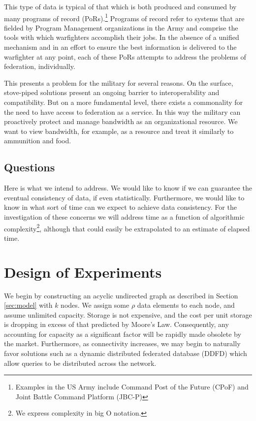 \documentclass[10pt]{./IEEEtran}
\begin{document}
This type of data is typical of that which is both produced and consumed by many programs of record (PoRs).\footnote{Examples in the US Army include Command Post of the Future (CPoF) and Joint Battle Command Platform (JBC-P)}  Programs of record refer to systems that are fielded by Program Management organizations in the Army and comprise the tools with which warfighters accomplish their jobs.  In the absence of a unified mechanism and in an effort to ensure the best information is delivered to the warfighter at any point, each of these PoRs attempts to address the problems of federation, individually.

This presents a problem for the military for several reasons.  On the surface, stove-piped solutions present an ongoing barrier to interoperability and compatibility.  But on a more fundamental level, there exists a commonality for the need to have access to federation as a service.  In this way the military can proactively protect and manage bandwidth as an organizational resource.  We want to view bandwidth, for example, as a resource and treat it similarly to ammunition and food.


\subsection{Questions}
Here is what we intend to address.  We would like to know if we can guarantee the eventual consistency of data, if even statistically.  Furthermore, we would like to know in what sort of time can we expect to achieve data consistency. For the investigation of these concerns we will address time as a function of algorithmic complexity\footnote{We express complexity in big O notation.}, although that could easily be extrapolated to an estimate of elapsed time.


\section{Design of Experiments}
\label{sec:doe}
We begin by constructing an acyclic undirected graph as described in Section \ref{sec:model} with $k$ nodes.  We assign some $\rho$ data elements to each node, and assume unlimited capacity.  Storage is not expensive, and the cost per unit storage is dropping in excess of that predicted by Moore's Law.  Consequently, any accounting for capacity as a significant factor will be rapidly made obsolete by the market.  Furthermore, as connectivity increases, we may begin to naturally favor solutions such as a dynamic distributed federated database (DDFD) which allow queries to be distributed across the network\cite{Bent2009}.
\end{document}
